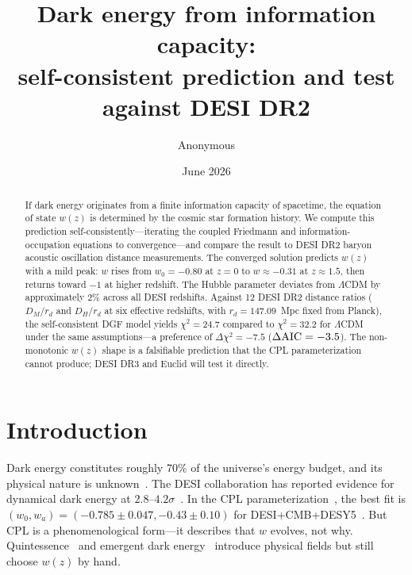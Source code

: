 \documentclass[12pt,a4paper]{article}
\begin{document}
\title{\bf Dark energy from information capacity:\\
self-consistent prediction and test against DESI DR2}

\author{Anonymous}
\date{June 2026}

\maketitle

\begin{abstract}
If dark energy originates from a finite information capacity of spacetime, the equation of state $w(z)$ is determined by the cosmic star formation history. We compute this prediction self-consistently---iterating the coupled Friedmann and information-occupation equations to convergence---and compare the result to DESI DR2 baryon acoustic oscillation distance measurements. The converged solution predicts $w(z)$ with a mild peak: $w$ rises from $w_0=-0.80$ at $z=0$ to $w\approx-0.31$ at $z\approx1.5$, then returns toward $-1$ at higher redshift. The Hubble parameter deviates from $\Lambda$CDM by approximately $2\%$ across all DESI redshifts. Against 12 DESI DR2 distance ratios ($D_M/r_d$ and $D_H/r_d$ at six effective redshifts, with $r_d=147.09$~Mpc fixed from Planck), the self-consistent DGF model yields $\chi^2=24.7$ compared to $\chi^2=32.2$ for $\Lambda$CDM under the same assumptions---a preference of $\Delta\chi^2=-7.5$ ($\Delta{\rm AIC}=-3.5$). The non-monotonic $w(z)$ shape is a falsifiable prediction that the CPL parameterization cannot produce; DESI DR3 and Euclid will test it directly.
\end{abstract}

\section*{Introduction}

Dark energy constitutes roughly 70\% of the universe's energy budget, and its physical nature is unknown~\cite{riess1998,spergel2003}. The DESI collaboration has reported evidence for dynamical dark energy at $2.8$--$4.2\sigma$~\cite{desi2025}. In the CPL parameterization~\cite{chevallier2001}, the best fit is $(w_0,w_a)=(-0.785\pm0.047,-0.43\pm0.10)$ for DESI+CMB+DESY5~\cite{li2026}. But CPL is a phenomenological form---it describes that $w$ evolves, not why. Quintessence~\cite{tsujikawa2013} and emergent dark energy~\cite{li2024} introduce physical fields but still choose $w(z)$ by hand.
\end{document}
